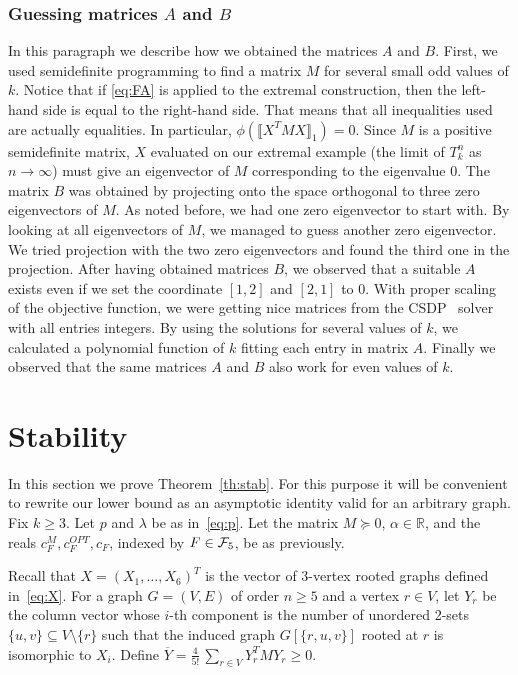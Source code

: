 \documentclass[12pt]{article}
\theoremstyle{definition}
\theoremstyle{remark}
\newcommand{\C}[1]{{\protect\mathcal{#1}}}
\renewcommand{\O}[1]{\overline{#1}}
\newcommand{\I}[1]{{\mathbb #1}}
\renewcommand{\ge}{\geqslant}
\renewcommand{\succeq}{\succcurlyeq}
\begin{document}
\subsubsection{Guessing matrices $A$ and $B$}\label{subsec:guessing}

In this paragraph we describe how we obtained the matrices $A$ and $B$.
First, we used semidefinite programming to find a matrix $M$ for several small odd values of $k$.
Notice that if \eqref{eq:FA} is applied to the extremal construction, then
the left-hand side is equal to the right-hand side. That means that all inequalities used are actually equalities.
In particular, $\phi\left(  \llbracket X^T M X \rrbracket_1  \right) = 0$. Since $M$ is a positive semidefinite
matrix, $X$ evaluated on our extremal example (the limit of $T_k^n$ as $n\to\infty$) must give an eigenvector of $M$ corresponding
to the eigenvalue 0. The matrix $B$ was obtained by projecting onto the space orthogonal to three zero
eigenvectors of  $M$. As noted before, we had one zero eigenvector to start with.
By looking at all eigenvectors of $M$, we managed to guess another zero eigenvector. 
We tried projection with the two zero eigenvectors and found the third one in the projection. 
After having obtained matrices $B$, we observed that a suitable $A$ exists even if we set the coordinate $[1,2]$ and $[2,1]$ to 0. With proper scaling of the objective function, we were getting nice matrices from the CSDP~\cite{Borchers1999} solver with all entries
integers. By using the solutions for several values of $k$, we calculated a polynomial function of $k$ fitting each 
entry in matrix $A$. Finally we observed that the same matrices $A$ and $B$ also work for even values of $k$.


\section{Stability}\label{sec:stability}

In this section we prove Theorem~\ref{th:stab}. For this purpose it will be convenient to rewrite our lower bound  as an asymptotic identity valid for an arbitrary graph. Fix $k\ge 3$. Let $p$ and $\lambda$ be as in~\eqref{eq:p}. Let the matrix $M\succeq 0$, $\alpha\in\I R
$, and the reals $c_F^M,c_F^{OPT},c_F$, indexed by $F\in\C F_5$, be as previously.

Recall that $X=(X_1,\dots,X_6)^T$ is the vector of $3$-vertex rooted graphs defined in~\eqref{eq:X}. For a graph $G=(V,E)$ of order $n\ge 5$ and a vertex $r\in V$, let $Y_r$ be the column vector whose $i$-th component is the number of unordered 2-sets $\{u,v\}\subseteq V\setminus\{r\}$ such that the induced graph $G[\{r,u,v\}]$ rooted at $r$ is isomorphic to $X_i$.  Define 
$
\O{Y}=\frac4{5!}\,\sum_{r\in V} Y_r^TMY_r\ge 0.
$ 
\end{document}
